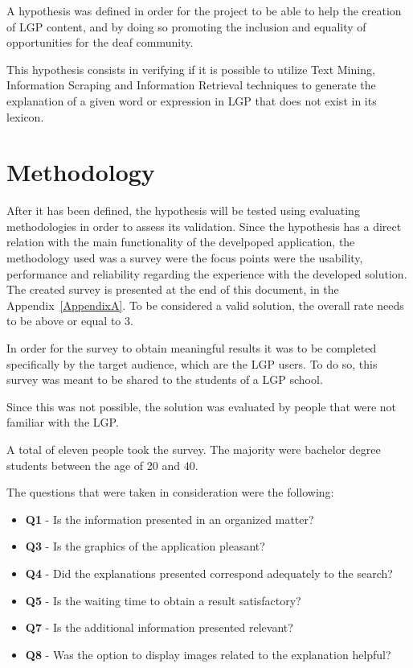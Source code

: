 A hypothesis was defined in order for the project to be able to help the creation of \gls{LGP} content, and by doing so promoting the inclusion and equality of opportunities for the deaf community.

This hypothesis consists in verifying if it is possible to utilize Text Mining\cite{gupta2009survey}, Information Scraping\cite{young2006method}\cite{rose2017automatically} and Information Retrieval\cite{baeza1999modern} techniques to generate the explanation of a given word or expression in \gls{LGP} that does not exist in its lexicon.

\section{Methodology}

After it has been defined, the hypothesis will be tested using evaluating methodologies in order to assess its validation.
Since the hypothesis has a direct relation with the main functionality of the develpoped application, the methodology used was a survey were the focus points were the usability, performance and reliability regarding the experience with the developed solution.
The created survey is presented at the end of this document, in the Appendix~\ref{AppendixA}.
To be considered a valid solution, the overall rate needs to be above or equal to 3.

In order for the survey to obtain meaningful results it was to be completed specifically by the target audience, which are the \gls{LGP} users.
To do so, this survey was meant to be shared to the students of a \gls{LGP} school.

Since this was not possible, the solution was evaluated by people that were not familiar with the \gls{LGP}.

A total of eleven people took the survey.
The majority were bachelor degree students between the age of 20 and 40.

The questions that were taken in consideration were the following:
\begin{itemize}
    \item \textbf{Q1} - Is the information presented in an organized matter?
    \item \textbf{Q3} - Is the graphics of the application pleasant?
    \item \textbf{Q4} - Did the explanations presented correspond adequately to the search?
    \item \textbf{Q5} - Is the waiting time to obtain a result satisfactory?
    \item \textbf{Q7} - Is the additional information presented relevant?
    \item \textbf{Q8} - Was the option to display images related to the explanation helpful?
\end{itemize}

